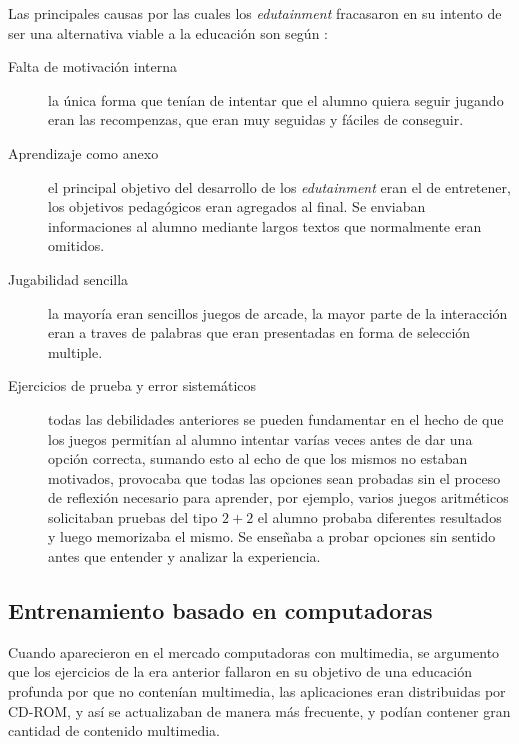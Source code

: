 Las principales causas por las cuales los \emph{edutainment} fracasaron en su
intento de ser una alternativa viable a la educación son según
\cite{egenfeldt2007third}: 

\begin{description}

    \item[Falta de motivación interna] la única forma que tenían de intentar que
	    el alumno quiera seguir jugando eran las recompenzas, que eran muy
	    seguidas y fáciles de conseguir.

    \item[Aprendizaje como anexo] el principal objetivo del desarrollo de los
	    \emph{edutainment} eran el de entretener, los objetivos pedagógicos
	    eran agregados al final. Se enviaban informaciones al alumno
	    mediante largos textos que normalmente eran omitidos.
    
    \item[Jugabilidad sencilla] la mayoría eran sencillos juegos de arcade, la
	    mayor parte de la interacción eran a traves de palabras que eran
	    presentadas en forma de selección multiple. 

    \item[Ejercicios de prueba y error sistemáticos] todas las debilidades
	    anteriores se pueden fundamentar en el hecho de que los juegos
	    permitían al alumno intentar varías veces antes de dar una opción
	    correcta, sumando esto al echo de que los mismos no estaban
	    motivados, provocaba que todas las opciones sean probadas sin el
	    proceso de reflexión necesario para aprender, por ejemplo, varios
	    juegos aritméticos solicitaban pruebas del tipo
	    \begin{math}{2+2}\end{math} el alumno probaba diferentes resultados
	    y luego memorizaba el mismo. Se enseñaba a probar opciones sin
	    sentido antes que entender y analizar la experiencia.

\end{description}

\subsection{Entrenamiento basado en computadoras}

Cuando aparecieron en el mercado computadoras con multimedia, se argumento que
los ejercicios de la era anterior fallaron en su objetivo de una educación
profunda por que no contenían multimedia\cite{leinonen:ict}, las aplicaciones
eran distribuidas por CD-ROM, y así se actualizaban de manera más frecuente, y
podían contener gran cantidad de contenido multimedia.

